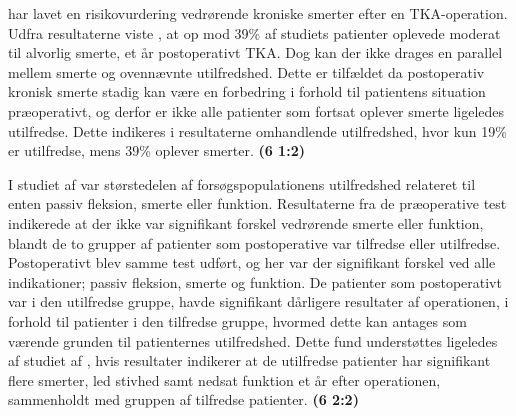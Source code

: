 \cite{Sakellariou2016} har lavet en risikovurdering vedrørende kroniske smerter efter en TKA-operation. Udfra resultaterne viste \cite{Sakellariou2016}, at op mod 39\% af studiets patienter oplevede moderat til alvorlig smerte, et år postoperativt TKA. Dog kan der ikke drages en parallel mellem smerte og ovennævnte utilfredshed. Dette er tilfældet da postoperativ kronisk smerte stadig kan være en forbedring i forhold til patientens situation præoperativt, og derfor er ikke alle patienter som fortsat oplever smerte ligeledes utilfredse. Dette indikeres i resultaterne omhandlende utilfredshed, hvor kun 19\% er utilfredse, mens 39\% oplever smerter. \textbf{(6 1:2)} \citep{Sakellariou2016} 

I studiet af \cite{Jacobs2014} var størstedelen af forsøgspopulationens utilfredshed relateret til enten passiv fleksion, smerte eller funktion. Resultaterne fra de præoperative test indikerede at der ikke var signifikant forskel vedrørende smerte eller funktion, blandt de to grupper af patienter som postoperative var tilfredse eller utilfredse. Postoperativt blev samme test udført, og her var der signifikant forskel ved alle indikationer; passiv fleksion, smerte og funktion. 
De patienter som postoperativt var i den utilfredse gruppe, havde signifikant dårligere resultater af operationen, i forhold til patienter i den tilfredse gruppe, hvormed dette kan antages som værende grunden til patienternes utilfredshed. \citep{Jacobs2014} 
Dette fund understøttes ligeledes af studiet af \cite{Bourne2010}, hvis resultater indikerer at de utilfredse patienter har signifikant flere smerter, led stivhed samt nedsat funktion et år efter operationen, sammenholdt med gruppen af tilfredse patienter. \citep{Bourne2010} \textbf{(6 2:2)}  

